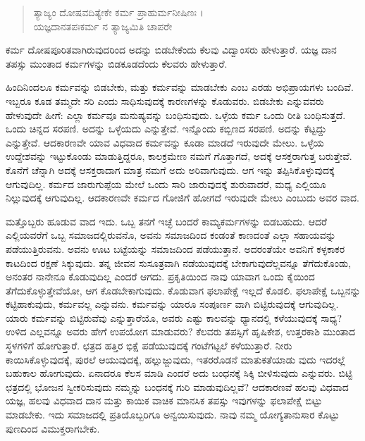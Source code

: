 \begin{verse}
ತ್ಯಾಜ್ಯಂ ದೋಷವದಿತ್ಯೇಕೇ ಕರ್ಮ ಪ್ರಾಹುರ್ಮನೀಷಿಣಃ ।\\ಯಜ್ಞದಾನತಪಃಕರ್ಮ ನ ತ್ಯಾಜ್ಯಮಿತಿ ಚಾಪರೇ 
\end{verse}

{\small ಕರ್ಮ ದೋಷಪೂರಿತವಾಗಿರುವುದರಿಂದ ಅದನ್ನು ಬಿಡಬೇಕೆಂದು ಕೆಲವು ವಿದ್ವಾಂಸರು ಹೇಳುತ್ತಾರೆ. ಯಜ್ಞ ದಾನ ತಪಸ್ಸು ಮುಂತಾದ ಕರ್ಮಗಳನ್ನು ಬಿಡಕೂಡದೆಂದು ಕೆಲವರು ಹೇಳುತ್ತಾರೆ.}

ಹಿಂದಿನಿಂದಲೂ ಕರ್ಮವನ್ನು ಬಿಡಬೇಕು, ಮತ್ತು ಕರ್ಮವನ್ನು ಮಾಡಬೇಕು ಎಂಬ ಎರಡು ಅಭಿಪ್ರಾಯಗಳು ಬಂದಿವೆ. ಇಬ್ಬರೂ ಕೂಡ ತಮ್ಮದೇ ಸರಿ ಎಂದು ಸಾಧಿಸುವುದಕ್ಕೆ ಕಾರಣಗಳನ್ನು ಕೊಡುವರು. ಬಿಡಬೇಕು ಎನ್ನುವವರು ಹೇಳುವುದೇ ಹೀಗೆ: ಎಲ್ಲಾ ಕರ್ಮವೂ ಮನುಷ್ಯವನ್ನು ಬಂಧಿಸುವುದು. ಒಳ್ಳೆಯ ಕರ್ಮ ಒಂದು ರೀತಿ ಬಂಧಿಸುತ್ತದೆ. ಒಂದು ಚಿನ್ನದ ಸರಪಣಿ. ಅದನ್ನು ಒಳ್ಳೆಯದು ಎನ್ನುತ್ತೇವೆ. ಇನ್ನೊಂದು ಕಬ್ಬಿಣದ ಸರಪಣಿ. ಅದನ್ನು ಕೆಟ್ಟದ್ದು ಎನ್ನುತ್ತೇವೆ. ಆದಕಾರಣವೇ ಯಾವ ವಿಧವಾದ ಕರ್ಮವನ್ನು ಕೂಡಾ ಮಾಡದೆ ಇರುವುದೇ ಮೇಲು. ಒಳ್ಳೆಯ ಉದ್ದೇಶವನ್ನು ಇಟ್ಟುಕೊಂಡು ಮಾಡುತ್ತಿದ್ದರೂ, ಕಾಲಕ್ರಮೇಣ ನಮಗೆ ಗೊತ್ತಾಗದೆ, ಅದಕ್ಕೆ ಆಸಕ್ತರಾಗುತ್ತ ಬರುತ್ತೇವೆ. ಕೊನೆಗೆ ಚೆನ್ನಾಗಿ ಅದಕ್ಕೆ ಆಸಕ್ತರಾದಾಗ ಮಾತ್ರ ನಮಗೆ ಅದು ಅರಿವಾಗುವುದು. ಆಗ ಇನ್ನು ತಪ್ಪಿಸಿಕೊಳ್ಳುವುದಕ್ಕೆ ಆಗುವುದಿಲ್ಲ. ಕರ್ಮದ ಜಾರುಗುಪ್ಪೆಯ ಮೇಲೆ ಒಂದು ಸಾರಿ ಜಾರುವುದಕ್ಕೆ ಶುರುವಾದರೆ, ಮಧ್ಯ ಎಲ್ಲಿಯೂ ನಿಲ್ಲುವುದಕ್ಕೆ ಆಗುವುದಿಲ್ಲ. ಆದಕಾರಣವೇ ಕರ್ಮದ ಗೋಜಿಗೆ ಹೋಗದೆ ಇರುವುದೇ ಮೇಲು ಎಂಬುದು ಅವರ ವಾದ.

ಮತ್ತೊಬ್ಬರು ಹೂಡುವ ವಾದ ಇದು. ಒಬ್ಬ ತನಗೆ ಇಚ್ಛೆ ಬಂದರೆ ಕಾಮ್ಯಕರ್ಮಗಳನ್ನು ಬಿಡಬಹುದು. ಆದರೆ ಎಲ್ಲಿಯವರೆಗೆ ಒಬ್ಬ ಸಮಾಜದಲ್ಲಿರುವನೊ, ಅವನು ಸಮಾಜದಿಂದ ಕಂಡಂತೆ ಕಾಣದಂತೆ ಎಲ್ಲಾ ಸಹಾಯವನ್ನು ಪಡೆಯುತ್ತಿರುವನು. ಅವನು ಊಟ ಬಟ್ಟೆಯನ್ನು ಸಮಾಜದಿಂದ ಪಡೆಯುತ್ತಾನೆ. ಅದರಂತೆಯೇ ಅವನಿಗೆ ಕಳ್ಳಕಾಕರ ಕಾಟದಿಂದ ರಕ್ಷಣೆ ಸಿಕ್ಕುವುದು. ತನ್ನ ಜೀವನ ಸುಸೂತ್ರವಾಗಿ ನಡೆಯುವುದಕ್ಕೆ ಬೇಕಾಗುವುದೆಲ್ಲವನ್ನೂ ತೆಗೆದುಕೊಂಡು, ಅನಂತರ ನಾನೇನೂ ಕೊಡುವುದಿಲ್ಲ ಎಂದರೆ ಆಗದು. ಪ್ರಕೃತಿಯಿಂದ ನಾವು ಯಾವಾಗ ಒಂದು ಕೈಯಿಂದ ತೆಗೆದುಕೊಳ್ಳುತ್ತೇವೆಯೋ, ಆಗ ಕೊಡಬೇಕಾಗುವುದು. ಕೊಡುವಾಗ ಫಲಾಪೇಕ್ಷೆ ಇಲ್ಲದೆ ಕೊಡಲಿ. ಫಲಾಪೇಕ್ಷೆ ಒಬ್ಬನನ್ನು ಕಟ್ಟಿಹಾಕುವುದು, ಕರ್ಮವಲ್ಲ ಎನ್ನುವನು. ಕರ್ಮವನ್ನು ಯಾರೂ ಸಂಪೂರ್ಣ ವಾಗಿ ಬಿಟ್ಟಿರುವುದಕ್ಕೆ ಆಗುವುದಿಲ್ಲ. ಯಾರು ಕರ್ಮವನ್ನು ಬಿಟ್ಟಿರುವೆವು ಎನ್ನುತ್ತಾರೆಯೊ, ಅವರು ಎಷ್ಟು ಕಾಲವನ್ನು ಧ್ಯಾನದಲ್ಲಿ ಕಳೆಯುವುದಕ್ಕೆ ಸಾಧ್ಯ? ಉಳಿದ ಎಲ್ಲವನ್ನೂ ಅವರು ಹೇಗೆ ಉಪಯೋಗ ಮಾಡುವರು? ಕೆಲವರು ತಪಸ್ಸಿಗೆ ಹೃಷಿಕೇಶ, ಉತ್ತರಕಾಶಿ ಮುಂತಾದ ಸ್ಥಳಗಳಿಗೆ ಹೋಗುತ್ತಾರೆ. ಛತ್ರದ ಹತ್ತಿರ ಭಿಕ್ಷೆ ಪಡೆಯುವುದಕ್ಕೆ ಗಂಟೆಗಟ್ಟಲೆ ಕಳೆಯುತ್ತಾರೆ. ನೀರು ಕಾಯಿಸಿಕೊಳ್ಳುವುದಕ್ಕೆ, ಪುರಲೆ ಆಯುವುದಕ್ಕೆ, ಹಲ್ಲುಜ್ಜುವುದು, ಇತರರೊಡನೆ ಮಾತುಕತೆಯಾಡು ವುದು ಇದರಲ್ಲೆ ಬಹುಕಾಲ ಹೋಗುವುದು. ಏನಾದರೂ ಕೆಲಸ ಮಾಡಿ ಎಂದರೆ ಅದು ಬಂಧನಕ್ಕೆ ಸಿಕ್ಕಿ ಬೀಳಿಸುವುದು ಎನ್ನುವರು. ಬಿಟ್ಟಿ ಛತ್ರದಲ್ಲಿ ಭೋಜನ ಸ್ವೀಕರಿಸುವುದು ನಮ್ಮನ್ನು ಬಂಧನಕ್ಕೆ ಗುರಿ ಮಾಡುವುದಿಲ್ಲವೆ? ಆದಕಾರಣವೆ ಹಲವು ವಿಧವಾದ ಯಜ್ಞ, ಹಲವು ವಿಧವಾದ ದಾನ ಮತ್ತು ಕಾಯಿಕ ವಾಚಿಕ ಮಾನಸಿಕ ತಪಸ್ಸು ಇವುಗಳನ್ನು ಫಲಾಪೇಕ್ಷೆ ಬಿಟ್ಟು ಮಾಡಬೇಕು. ಇದು ಸಮಾಜದಲ್ಲಿ ಪ್ರತಿಯೊಬ್ಬರಿಗೂ ಅನ್ವಯಿಸುವುದು. ನಾವು ನಮ್ಮ ಯೋಗ್ಯತಾನುಸಾರ ಕೊಟ್ಟು ಪುಣದಿಂದ ವಿಮುಕ್ತರಾಗಬೇಕು.

